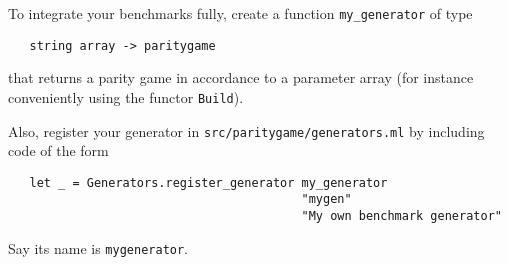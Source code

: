 To integrate your benchmarks fully, create a function \verb#my_generator# of type 
\begin{verbatim}
   string array -> paritygame
\end{verbatim}
that returns a parity game in accordance to a parameter array (for instance conveniently using the functor \verb#Build#).

Also, register your generator in \texttt{src/paritygame/generators.ml} by including
code of the form
\begin{verbatim}
   let _ = Generators.register_generator my_generator 
                                         "mygen" 
                                         "My own benchmark generator"
\end{verbatim}
Say its name is \verb#mygenerator#.



